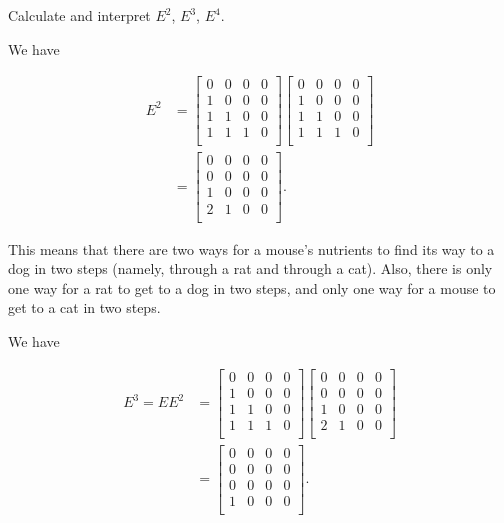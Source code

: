 \documentclass[../key.tex]{subfiles}
\begin{document}
\begin{inner_problem}
\item Calculate and interpret $E^2$, $E^3$, $E^4$.
\end{inner_problem}

We have

\begin{align*}
E^2 &= \begin{bmatrix}
0 & 0 & 0 & 0 \\
1 & 0 & 0 & 0 \\
1 & 1 & 0 & 0 \\
1 & 1 & 1 & 0 \\
\end{bmatrix} \begin{bmatrix}
0 & 0 & 0 & 0 \\
1 & 0 & 0 & 0 \\
1 & 1 & 0 & 0 \\
1 & 1 & 1 & 0 \\
\end{bmatrix} \\
&= \begin{bmatrix}
0 & 0 & 0 & 0 \\
0 & 0 & 0 & 0 \\
1 & 0 & 0 & 0 \\
2 & 1 & 0 & 0 \\
\end{bmatrix}.
\end{align*}

This means that there are two ways for a mouse's nutrients to find its way to a dog in two steps (namely, through a rat and through a cat). Also, there is only one way for a rat to get to a dog in two steps, and only one way for a mouse to get to a cat in two steps.

We have

\begin{align*}
E^3 = EE^2 &= \begin{bmatrix}
0 & 0 & 0 & 0 \\
1 & 0 & 0 & 0 \\
1 & 1 & 0 & 0 \\
1 & 1 & 1 & 0 \\
\end{bmatrix}\begin{bmatrix}
0 & 0 & 0 & 0 \\
0 & 0 & 0 & 0 \\
1 & 0 & 0 & 0 \\
2 & 1 & 0 & 0 \\
\end{bmatrix} \\
&= \begin{bmatrix}
0 & 0 & 0 & 0 \\
0 & 0 & 0 & 0 \\
0 & 0 & 0 & 0 \\
1 & 0 & 0 & 0 \\
\end{bmatrix}.
\end{align*}
\end{document}
